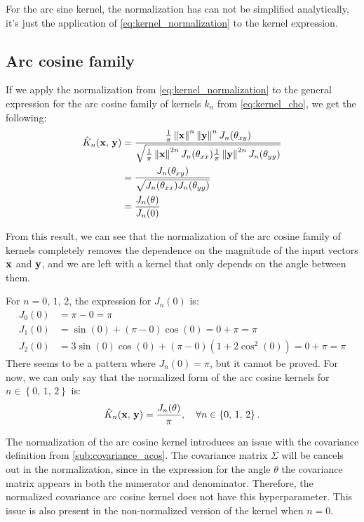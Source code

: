For the arc sine kernel, the normalization has can not be simplified analytically,
it's just the application of \cref{eq:kernel_normalization} to the kernel expression.

\subsection{Arc cosine family}%
\label{sub:kernel_normalization_acos}

If we apply the normalization from \cref{eq:kernel_normalization} to the
general expression for the arc cosine family of kernels $k_n$ from
\cref{eq:kernel_cho}, we get the following:
\begin{align}
    \hat{K}_n(\mathbf{x},\,\mathbf{y}) & = \frac{
        \frac{1}{\pi} \left\lVert \mathbf{x} \right\rVert^n \left\lVert \mathbf{y} \right\rVert^n J_n(\theta_{xy})
    }{\sqrt{
            \frac{1}{\pi} \left\lVert \mathbf{x} \right\rVert^{2n} J_n(\theta_{xx})
            \frac{1}{\pi} \left\lVert \mathbf{y} \right\rVert^{2n} J_n(\theta_{yy})
    }}                                                                                        \\
                       & = \frac{ J_n(\theta_{xy}) }{\sqrt{ J_n(\theta_{xx}) J_n(\theta_{yy})
    }}                                                                                        \\
                       & = \frac{ J_n(\theta) }{J_n(0)}
\end{align}

From this result, we can see that the normalization of the arc cosine family of kernels
completely removes the dependence on the magnitude of the input vectors $\mathbf{x}$ and $\mathbf{y}$, and
we are left with a kernel that only depends on the angle between them.

For $n = 0,\,1,\,2$, the expression for $J_n(0)$ is:
\begin{align}
    J_0(0) & = \pi - 0 = \pi                                                          \\
    J_1(0) & = \sin(0) + (\pi - 0)\cos(0) = 0 + \pi = \pi                             \\
    J_2(0) & = 3\sin(0)\cos(0) + (\pi - 0)\left(1 + 2\cos^2(0)\right) = 0 + \pi = \pi
\end{align}
There seems to be a pattern where $J_n(0) = \pi$, but it cannot be proved. For
now, we can only say that the normalized form of the arc cosine kernels
for $n \in \left\{ 0,\,1,\,2 \right\}$ is:
\begin{equation}
    \hat{K}_n(\mathbf{x},\,\mathbf{y}) = \frac{J_n(\theta)}{\pi}, \quad \forall n \in \left\{ 0,\,1,\,2 \right\}.
\end{equation}


The normalization of the arc cosine kernel introduces an issue with the
covariance definition from \cref{sub:covariance_acos}. The covariance matrix
$\Sigma$ will be cancels out in the normalization, since in the expression
for the angle $\theta$ the covariance matrix appears in both the numerator and
denominator. Therefore, the normalized covariance arc cosine kernel does
not have this hyperparameter. This issue is also present in the non-normalized
version of the kernel when $n = 0$.
